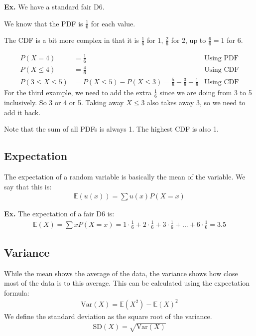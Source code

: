 \documentclass[12pt,letterpaper]{article} \usepackage{amsmath} \usepackage{graphicx} \usepackage[margin=1in]{geometry} \usepackage{longtable}  \usepackage{amssymb}
\begin{document}
	\begin{mdframed}
		\textbf{Ex. } We have a standard fair D6. 
		
		We know that the PDF is $\frac{1}{6}$ for each value. 
		
		The CDF is a bit more complex in that it is $\frac{1}{6}$ for 1, $\frac{2}{6}$ for 2, up to $\frac{6}{6} = 1$ for 6. 
		
		\begin{align*}
			P(X=4) &= \frac{1}{6} &\text{Using PDF}\\
			P(X\le 4) &= \frac{4}{6}  &\text {Using CDF}\\
			P(3\le X\le 5) &= P(X\le 5) - P(X\le 3) = \frac{5}{6} - \frac{3}{6} + \frac {1}{6} &\text{Using CDF}
		\end{align*}
		For the third example, we need to add the extra $\frac{1}{6}$ since we are doing from 3 to 5 inclusively. So 3 or 4 or 5. Taking away $X\le 3$ also takes away 3, so we need to add it back.
	\end{mdframed}
	
	Note that the sum of all PDFs is always 1. The highest CDF is also 1. 
	
	\subsection{Expectation}
	The expectation of a random variable is basically the mean of the variable. We say that this is:
	\begin{align*}
		\mathbb E (u(x)) = \sum u(x)P(X=x)
	\end{align*}

	\begin{mdframed}
		\textbf{Ex. } The expectation of a fair D6 is:
		\begin{align*}
			\mathbb E (X) = \sum xP(X=x) = 1\cdot\frac{1}{6} + 2\cdot \frac{1}{6} + 3\cdot \frac{1}{6} + ... + 6\cdot \frac{1}{6} = 3.5
		\end{align*}
	\end{mdframed}
	
	\subsection{Variance}
	While the mean shows the average of the data, the variance shows how close most of the data is to this average. This can be calculated using the expectation formula:
	\begin{align*}
		\text{Var}(X) = \mathbb E (X^2) - \mathbb E(X)^2
	\end{align*}
	We define the standard deviation as the square root of the variance. 
	\begin{align*}
		\text{SD}(X) = \sqrt{\text{Var}(X)}
	\end{align*}
\end{document}
